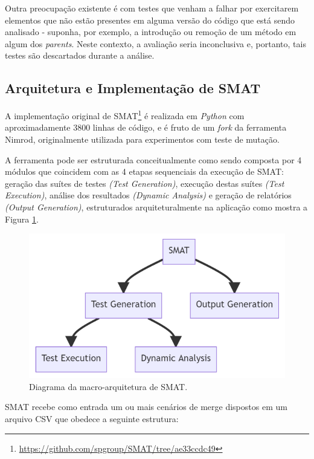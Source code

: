 \documentclass[12pt]{article}
\begin{document}
Outra preocupação existente é com testes que venham a falhar por exercitarem elementos que não estão presentes em alguma versão do código que está sendo analisado - suponha, por exemplo, a introdução ou remoção de um método em algum dos \textit{parents}. Neste contexto, a avaliação seria inconclusiva e, portanto, tais testes são descartados durante a análise.

\subsection{Arquitetura e Implementação de SMAT}
A implementação original de SMAT\footnote{\href{https://github.com/spgroup/SMAT/tree/ae33ccdc49}{https://github.com/spgroup/SMAT/tree/ae33ccdc49}} é realizada em \textit{Python} com aproximadamente 3800 linhas de código, e é fruto de um \textit{fork} da ferramenta Nimrod, originalmente utilizada para experimentos com teste de mutação.

A ferramenta pode ser estruturada conceitualmente como sendo composta por 4 módulos que coincidem com as 4 etapas sequenciais da execução de SMAT: geração das suítes de testes \textit{(Test Generation)}, execução destas suítes \textit{(Test Execution)}, análise dos resultados \textit{(Dynamic Analysis)} e geração de relatórios \textit{(Output Generation)}, estruturados arquiteturalmente na aplicação como mostra a Figura \ref{fig:macro-velha}.

\begin{figure}[H]
    \centering
    \includegraphics[width=.5\textwidth]{imagens/arquitetura-velha.png}
    \caption{Diagrama da macro-arquitetura de SMAT.}
    \label{fig:macro-velha}
\end{figure}

SMAT recebe como entrada um ou mais cenários de merge dispostos em um arquivo CSV que obedece a seguinte estrutura:
\end{document}
